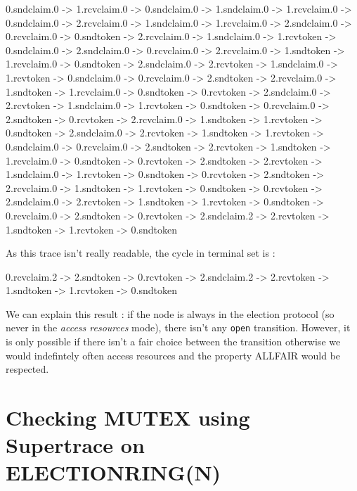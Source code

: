 \documentclass{article}
\begin{document}
\begin{spverbatim}
0.sndclaim.0 -> 1.rcvclaim.0  -> 0.sndclaim.0 -> 1.sndclaim.0 -> 1.rcvclaim.0 -> 0.sndclaim.0 -> 2.rcvclaim.0 -> 1.sndclaim.0 -> 1.rcvclaim.0 -> 2.sndclaim.0 -> 0.rcvclaim.0 -> 0.sndtoken -> 2.rcvclaim.0 -> 1.sndclaim.0 -> 1.rcvtoken -> 0.sndclaim.0 -> 2.sndclaim.0 -> 0.rcvclaim.0 -> 2.rcvclaim.0 -> 1.sndtoken -> 1.rcvclaim.0 -> 0.sndtoken -> 2.sndclaim.0 -> 2.rcvtoken -> 1.sndclaim.0 -> 1.rcvtoken -> 0.sndclaim.0 -> 0.rcvclaim.0 -> 2.sndtoken -> 2.rcvclaim.0 -> 1.sndtoken -> 1.rcvclaim.0 -> 0.sndtoken -> 0.rcvtoken -> 2.sndclaim.0 -> 2.rcvtoken -> 1.sndclaim.0 -> 1.rcvtoken -> 0.sndtoken -> 0.rcvclaim.0 -> 2.sndtoken -> 0.rcvtoken -> 2.rcvclaim.0 -> 1.sndtoken -> 1.rcvtoken -> 0.sndtoken -> 2.sndclaim.0 -> 2.rcvtoken -> 1.sndtoken -> 1.rcvtoken -> 0.sndclaim.0 -> 0.rcvclaim.0 -> 2.sndtoken -> 2.rcvtoken -> 1.sndtoken -> 1.rcvclaim.0 -> 0.sndtoken -> 0.rcvtoken -> 2.sndtoken -> 2.rcvtoken -> 1.sndclaim.0 -> 1.rcvtoken -> 0.sndtoken -> 0.rcvtoken -> 2.sndtoken -> 2.rcvclaim.0 -> 1.sndtoken -> 1.rcvtoken -> 0.sndtoken -> 0.rcvtoken -> 2.sndclaim.0 -> 2.rcvtoken -> 1.sndtoken -> 1.rcvtoken -> 0.sndtoken -> 0.rcvclaim.0 -> 2.sndtoken -> 0.rcvtoken -> 2.sndclaim.2 -> 2.rcvtoken -> 1.sndtoken -> 1.rcvtoken -> 0.sndtoken
\end{spverbatim}
\bigskip

As this trace isn't really readable, the cycle in terminal set is : \newline

\begin{spverbatim}
0.rcvclaim.2 -> 2.sndtoken -> 0.rcvtoken -> 2.sndclaim.2 -> 2.rcvtoken -> 1.sndtoken -> 1.rcvtoken -> 0.sndtoken
\end{spverbatim}
\bigskip

We can explain this result : if the node is always in the election protocol (so never in the \textit{access resources} mode), there isn't any \verb#open# transition. However, it is only possible if there isn't a fair choice between the transition otherwise we would indefintely often access resources and the property ALLFAIR would be respected.



\section{Checking MUTEX using Supertrace on ELECTIONRING(N)}

\end{document}
